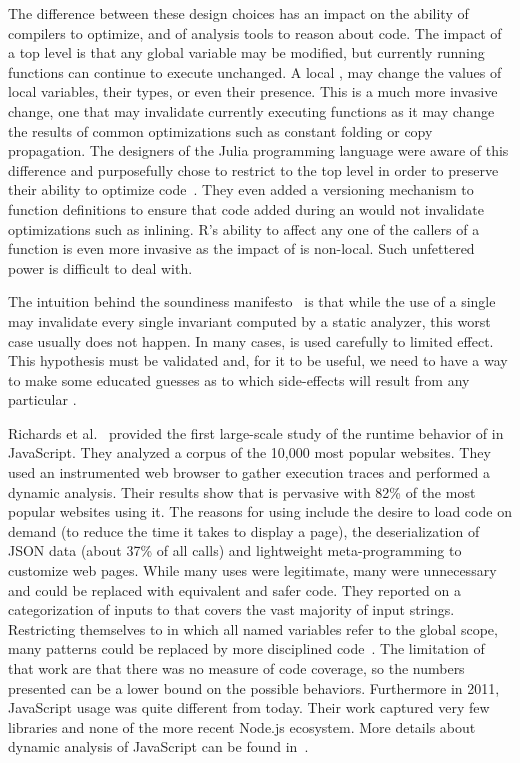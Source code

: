 \documentclass[USenglish,cleveref, autoref, thm-restate]{lipics-v2019}
\begin{document}
The difference between these design choices has an impact on the ability of
compilers to optimize, and of analysis tools to reason about code. The
impact of a top level \eval is that any global variable may be modified, but
currently running functions can continue to execute unchanged. A local
\eval, may change the values of local variables, their types, or even their
presence. This is a much more invasive change, one that may invalidate
currently executing functions as it may change the results of common
optimizations such as constant folding or copy propagation. The designers of
the Julia programming language were aware of this difference and
purposefully chose to restrict \eval to the top level in order to preserve
their ability to optimize code~\cite{oopsla18a}. They even added a
versioning mechanism to function definitions to ensure that code added
during an \eval would not invalidate optimizations such as inlining.  R's
ability to affect any one of the callers of a function is even more invasive
as the impact of \eval is non-local. Such unfettered power is difficult to
deal with.

The intuition behind the soundiness manifesto~\cite{soundy} is that while
the use of a single \eval may invalidate every single invariant computed by
a static analyzer, this worst case usually does not happen.  In many cases,
\eval is used carefully to limited effect. This hypothesis must be validated
and, for it to be useful, we need to have a way to make some educated
guesses as to which side-effects will result from any particular \eval.

Richards et al.~\cite{ecoop11} provided the first large-scale study of the
runtime behavior of \eval in JavaScript. They analyzed a corpus of the
10,000 most popular websites. They used an instrumented web browser to
gather execution traces and performed a dynamic analysis.  Their results show
that \eval is pervasive with 82\% of the most popular websites using it. The
reasons for using \eval include the desire to load code on demand (to reduce
the time it takes to display a page), the deserialization of JSON data
(about 37\% of all calls) and lightweight meta-programming to customize web
pages.  While many uses \eval were legitimate, many were unnecessary and
could be replaced with equivalent and safer code.  They reported on a
categorization of inputs to \eval that covers the vast majority of input
strings.  Restricting themselves to \eval in which all named variables refer
to the global scope, many patterns could be replaced by more disciplined
code~\cite{oopsla12b}.  The limitation of that work are that there was no
measure of code coverage, so the numbers presented can be a lower bound on
the possible behaviors.  Furthermore in 2011, JavaScript usage was quite
different from today. Their work captured very few libraries and none of the
more recent Node.js ecosystem.  More details about dynamic analysis of
JavaScript can be found in~\cite{liang}.
\end{document}
